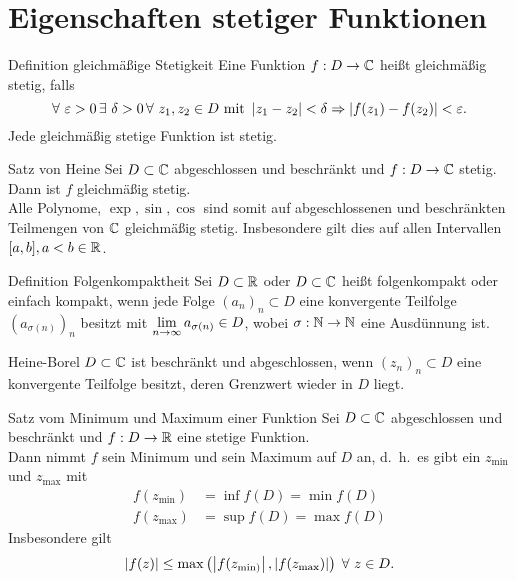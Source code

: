 \documentclass[main.tex]{subfiles}
\begin{document}
\section*{Eigenschaften stetiger Funktionen}
\begin{karte}{Definition gleichmäßige Stetigkeit}
    Eine Funktion \( f: D \rightarrow \mathbb{C} \) 
    heißt gleichmäßig stetig, falls
    \[ \forall \, \varepsilon > 0 \,\exists \, 
    \delta > 0 \,\forall \, z_1, z_2 \in D \text{ mit } 
    \abs{z_1 - z_2} < \delta \Rightarrow 
    \abs{f(z_1) - f(z_2)} < \varepsilon. \]
    Jede gleichmäßig stetige Funktion ist stetig.
\end{karte}
\begin{karte}{Satz von Heine}
    Sei \( D \subset \mathbb{C} \) abgeschlossen und beschränkt
    und \( f: D \rightarrow \mathbb{C} \) stetig. \\
    Dann ist \(f\) gleichmäßig stetig. \\
    Alle Polynome, \( \exp, \sin, \cos \) sind somit
    auf abgeschlossenen und beschränkten Teilmengen
    von \( \mathbb{C} \) gleichmäßig stetig. Insbesondere 
    gilt dies auf allen Intervallen \( [a,b], 
    a<b \in\mathbb{R} \).
\end{karte}
\begin{karte}{Definition Folgenkompaktheit}
    Sei \( D \subset \mathbb{R} \) oder \( D \subset \mathbb{C} \)
    heißt folgenkompakt oder einfach kompakt, wenn
    jede Folge \( {(a_n)}_n \subset D \) eine
    konvergente Teilfolge \( {(a_{\sigma(n)})}_n \)
    besitzt mit \( \lim\limits_{n\rightarrow\infty} a_{\sigma(n)} \in D \), 
    wobei \( \sigma : \mathbb{N} \rightarrow \mathbb{N} \) eine 
    Ausdünnung ist.
\end{karte}
\begin{karte}{Heine-Borel}
    \( D \subset \mathbb{C} \) ist beschränkt und abgeschlossen, 
    wenn \( {(z_n)}_n \subset D \) eine konvergente
    Teilfolge besitzt, deren Grenzwert wieder in 
    \( D \) liegt.
\end{karte}
\begin{karte}{Satz vom Minimum und Maximum einer Funktion}
    Sei \( D \subset \mathbb{C} \) abgeschlossen und 
    beschränkt und \( f : D \rightarrow \mathbb{R} \) eine
    stetige Funktion.\\
    Dann nimmt \(f\) sein Minimum und sein Maximum 
    auf \(D\) an, d.\ h.\ es gibt ein \( z_{\min} \)
    und \( z_{\max} \) mit
    \begin{align*}
        f(z_{\min}) &= \inf f(D) = \min f(D) \\
        f(z_{\max}) &= \sup f(D) = \max f(D)
    \end{align*}
    Insbesondere gilt 
    \[ \abs{f(z)} \leq \max \left( \abs{ f(z_{\min)} }, 
    \abs{ f(z_{\max}) } \right) \; \forall \, z\in D. \]
\end{karte}
\end{document}
